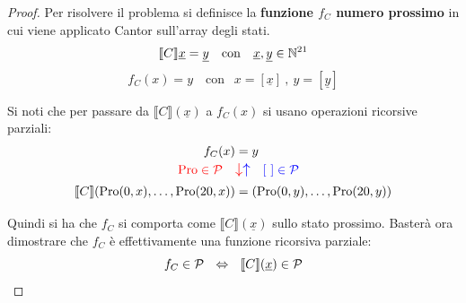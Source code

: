 \begin{proof}
	Per risolvere il problema si definisce la \textbf{funzione $f_C$ numero prossimo} in cui viene applicato Cantor sull'array degli stati.
	$$ \llbracket C \rrbracket \underline{x} = \underline{y} \quad \text{con }
	\ \ \underline{x},\underline{y}\in \mathbb{N}^{21}$$
	$$ f_C(x)=y \quad \text{con }
	\ \ x=[\underline{x}]\ ,\ y=[\underline{y}]$$
	
	Si noti che per passare da $\llbracket C \rrbracket (\underline{x})$ a $f_C(x)$ 
	si usano operazioni ricorsive parziali:
	$$\begin{aligned}
		f_C(x)&=y \\
		{\color{red}\pro \in \cp}\quad &
		\mathlarger{{\color{red}\downarrow}{\color{blue}\uparrow}}
		\quad\color{blue}[\ ]\in \cp \\
		\llbracket C \rrbracket (\pro(0,x),\dots,\pro(20,x))& =(\pro(0,y),\dots,\pro(20,y))
	\end{aligned}$$
	
	Quindi si ha che $f_C$ si comporta come $\llbracket C \rrbracket (\underline{x})$ sullo stato prossimo. Basterà ora dimostrare che $f_C$ è effettivamente una funzione ricorsiva parziale:
	$$ f_C\in \mathcal{P} \ \ \Leftrightarrow \ \ \llbracket C \rrbracket (\underline{x}) \in \mathcal{P} $$
	

\end{proof}
